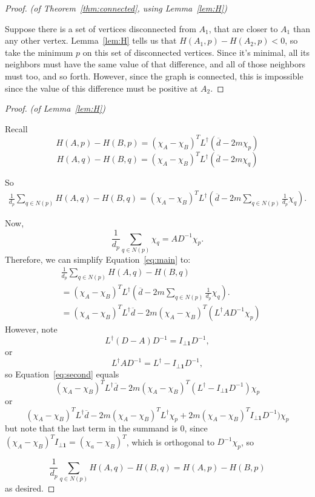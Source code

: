 \begin{proof}\textit{(of Theorem~\ref{thm:connected}, using
    Lemma~\ref{lem:H})}

Suppose there is a set of vertices disconnected from $A_1$, that
are closer to $A_1$ than any other vertex. Lemma~\ref{lem:H} tells
us that $H(A_1,p)-H(A_2,p) < 0$, so take the minimum $p$ on this
set of disconnected vertices. Since it's minimal, all its
neighbors must have the same value of that difference, and all of
those neighbors must too, and so forth. However, since the graph
is connected, this is impossible since the value of this
difference must be positive at $A_2$.
\end{proof}
\begin{proof}\textit{(of Lemma~\ref{lem:H})}

Recall 
\[ H(A, p) - H(B, p) = (\chi_A - \chi_B)^T L^\dag (\overline{d} - 2m
    \chi_p) \]
\[ H(A, q) - H(B, q) = (\chi_A - \chi_B)^T L^\dag (\overline{d} - 2m
    \chi_q) \]

So 
\begin{align}
\frac{1}{d_p} \sum_{q \in N(p)} H(A, q) - H(B, q)
= (\chi_A - \chi_B)^T L^\dag (\overline{d} -2m
\sum_{q \in N(p)} \frac{1}{d_p} \chi_q).
\label{eq:main}
\end{align}

Now, 
\[  \frac{1}{d_p} \sum_{q \in N(p)} \chi_q 
= AD^{-1} \chi_p. \]
Therefore,  we can simplify Equation~\ref{eq:main} to:
\begin{align}
& \frac{1}{d_p} \sum_{q \in N(p)} H(A, q) - H(B, q)
  \\
& = (\chi_A - \chi_B)^T L^\dag (\overline{d} -2m
\sum_{q \in N(p)} \frac{1}{d_p} \chi_q).
\\
&= (\chi_A - \chi_B)^T L^\dag \overline{d} -2m(\chi_A -
    \chi_B)^T (L^\dag AD^{-1} \chi_p) \label{eq:second}
\end{align}
However, note
\[L^\dag (D-A) D^{-1} = I_{\bot \textbf{1}} D^{-1}, \]
or 
\[ L^\dag A D^{-1} = L^\dag - I_{\bot \textbf{1}} D^{-1},\]
so Equation~\ref{eq:second} equals
\[ (\chi_A - \chi_B)^T L^\dag \overline{d} -2m(\chi_A -
    \chi_B)^T (L^\dag - I_{\bot \textbf{1}} D^{-1}) \chi_p \]
or
\[ (\chi_A - \chi_B)^T L^\dag \overline{d} -2m(\chi_A -
    \chi_B)^T L^\dag \chi_p  +2m (\chi_A - \chi_B)^T I_{\bot \textbf{1}} D^{-1}) \chi_p \]
    but note that the last term in the summand is $0$, since
    $(\chi_A - \chi_B)^T I_{\bot \textbf{1}}  = (\chi_a -
        \chi_B)^T$, which is orthogonal to $D^{-1} \chi_p$, so 

\[ \frac{1}{d_p} \sum_{q \in N(p)} H(A,q)-H(B,q) = H(A, p) - H(B,
    p) \]
as desired.
\end{proof}
